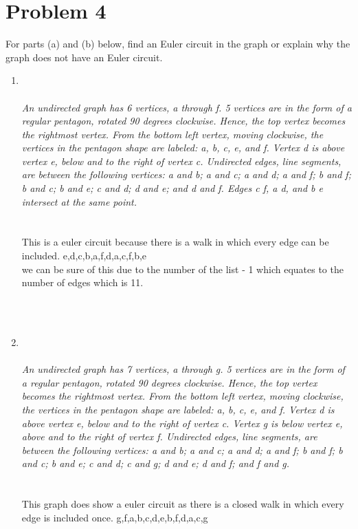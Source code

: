  \newpage
 

\section*{Problem 4}
For parts (a) and (b) below, find an Euler circuit in the graph or explain why the graph does not have an Euler circuit.\\
\begin{enumerate}[label=(\alph*)]
\item
{}\\\\
{\color{blue}{\bf Figure 9:} \emph{An undirected graph has 6 vertices, a through f. 5 vertices are in the form of a regular pentagon, rotated 90 degrees clockwise. Hence, the top vertex becomes the rightmost vertex. From the bottom left vertex, moving clockwise, the vertices in the pentagon shape are labeled: a, b, c, e, and f. Vertex d is above vertex e, below and to the right of vertex c. Undirected edges, line segments, are between the following vertices: a and b; a and c; a and d; a and f; b and f; b and c; b and e; c and d; d and e; and d and f. Edges c f, a d, and b e intersect at the same point.
\\
}
}
\\
\\
This is a euler circuit because there is a walk in which every edge can be included. e,d,c,b,a,f,d,a,c,f,b,e \\
we can be sure of this due to the number of the list - 1 which equates to the number of edges which is 11.

\\\\

\newpage
\item
{}\\\\
{\color{blue}{\bf Figure 10:} \emph{An undirected graph has 7 vertices, a through g. 5 vertices are in the form of a regular pentagon, rotated 90 degrees clockwise. Hence, the top vertex becomes the rightmost vertex. From the bottom left vertex, moving clockwise, the vertices in the pentagon shape are labeled: a, b, c, e, and f. Vertex d is above vertex e, below and to the right of vertex c. Vertex g is below vertex e, above and to the right of vertex f. Undirected edges, line segments, are between the following vertices: a and b; a and c; a and d; a and f; b and f; b and c; b and e; c and d; c and g; d and e; d and f; and f and g.
\\
}
}
\\
\\
This graph does show a euler circuit as there is a closed walk in which every edge is included once. 
g,f,a,b,c,d,e,b,f,d,a,c,g


\end{enumerate}
